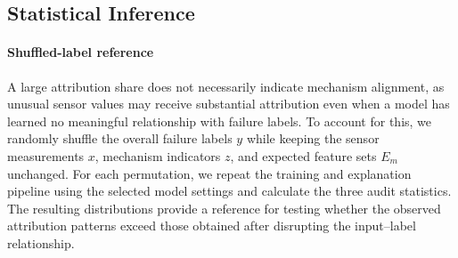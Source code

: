 \documentclass[conference]{IEEEtran}
\begin{document}


\subsection{Statistical Inference}
\label{sec:nulls}

\paragraph{Shuffled-label reference}
A large attribution share does not necessarily indicate mechanism alignment, as unusual sensor values may receive substantial attribution even when a model has learned no meaningful relationship with failure labels. To account for this, we randomly shuffle the overall failure labels $y$ while keeping the sensor measurements $x$, mechanism indicators $z$, and expected feature sets $E_m$ unchanged. For each permutation, we repeat the training and explanation pipeline using the selected model settings and calculate the three audit statistics. The resulting distributions provide a reference for testing whether the observed attribution patterns exceed those obtained after disrupting the input--label relationship.
\end{document}
